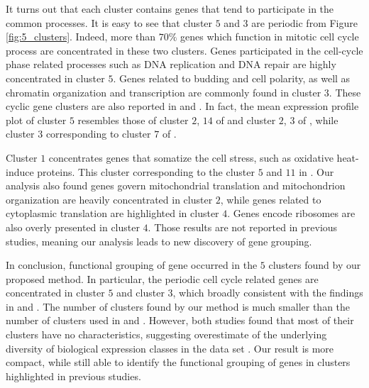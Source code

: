 \documentclass[12pt]{article}
\begin{document}
It turns out that each cluster contains genes that tend to participate in the common processes. It is easy to see that cluster $5$ and $3$ are periodic from Figure \ref{fig:5_clusters}. Indeed, more than $70\%$ genes which function in mitotic cell cycle process are concentrated in these two clusters. Genes participated in the cell-cycle phase related processes such as DNA replication and DNA repair are highly concentrated in cluster $5$. Genes related to budding and cell polarity, as well as chromatin organization and transcription are commonly found in cluster $3$. These cyclic gene clusters are also reported in \cite{tavazoie1999systematic} and \cite{dortet2008model}. In fact, the mean expression profile plot of cluster $5$ resembles those of cluster $2$, $14$ of \cite{tavazoie1999systematic} and cluster $2$, $3$ of \cite{dortet2008model}, while cluster $3$ corresponding to cluster $7$ of \cite{tavazoie1999systematic}.

Cluster $1$ concentrates genes that somatize the cell stress, such as oxidative heat-induce proteins. This cluster corresponding to the cluster $5$ and $11$ in \cite{dortet2008model}.
Our analysis also found genes govern mitochondrial translation and mitochondrion organization are heavily concentrated in cluster $2$, while genes related to cytoplasmic translation are highlighted in cluster $4$. Genes encode ribosomes are also overly presented in cluster $4$. Those results are not reported in previous studies, meaning our analysis leads to new discovery of gene grouping. 

In conclusion, functional grouping of gene occurred in the $5$ clusters found by our proposed method. In particular, the periodic cell cycle related genes are concentrated in cluster $5$ and cluster $3$, which broadly consistent with the findings in \cite{tavazoie1999systematic} and \cite{dortet2008model}. The number of clusters found by our method is much smaller than the number of clusters used in \cite{tavazoie1999systematic} and \cite{dortet2008model}. However, both studies found that most of their clusters have no characteristics, suggesting overestimate of the underlying diversity of biological expression classes in the data set \citep{tavazoie1999systematic}. Our result is more compact, while still able to identify the functional grouping of genes in clusters highlighted in previous studies.
\end{document}
